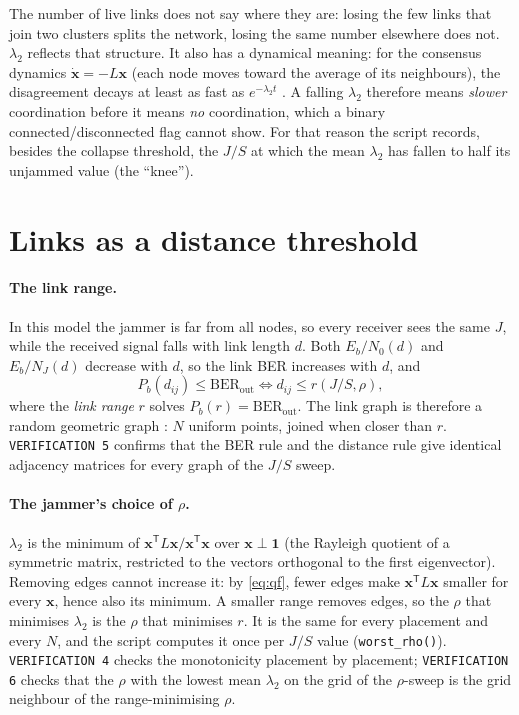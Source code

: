 \documentclass[11pt,a4paper]{article}
\newcommand{\bone}{\mathbf 1}
\newcommand{\bx}{\mathbf x}
\newcommand{\T}{^{\mathsf T}}
\newcommand{\BERout}{\mathrm{BER}_{\mathrm{out}}}
\begin{document}
The number of live links does not say where they are: losing the few links
that join two clusters splits the network, losing the same number elsewhere
does not. $\lambda_2$ reflects that structure. It also has a dynamical meaning: for the consensus dynamics
$\dot{\bx} = -L\bx$ (each node moves toward the average of its neighbours),
the disagreement decays at least as fast as $e^{-\lambda_2 t}$
\cite[Corollary~1]{olfati}. A falling
$\lambda_2$ therefore means \emph{slower} coordination before it means
\emph{no} coordination, which a binary connected/disconnected flag cannot show.
For that reason the script records, besides the collapse threshold, the $J/S$
at which the mean $\lambda_2$ has fallen to half its unjammed value (the
``knee'').

\section{Links as a distance threshold}

\paragraph{The link range.}
In this model the jammer is far from all nodes, so every receiver sees the same
$J$, while the received signal falls with link length $d$. Both
$E_b/N_0(d)$ and $E_b/N_J(d)$ decrease with $d$, so the link BER increases with
$d$, and
\[
  P_b(d_{ij})\le\BERout \iff d_{ij}\le r(J/S,\rho),
\]
where the \emph{link range} $r$ solves $P_b(r)=\BERout$. The link graph is
therefore a random geometric graph \cite{penrose}: $N$ uniform points, joined
when closer than $r$. \texttt{VERIFICATION 5} confirms that the BER rule and
the distance rule give identical adjacency matrices for every graph of the
$J/S$ sweep.

\paragraph{The jammer's choice of $\rho$.}
$\lambda_2$ is the minimum of $\bx\T L\bx/\bx\T\bx$ over $\bx\perp\bone$
(the Rayleigh quotient of a symmetric matrix, restricted to the vectors
orthogonal to the first eigenvector). Removing edges cannot increase it: by
\eqref{eq:qf}, fewer edges make $\bx\T L\bx$ smaller for every $\bx$, hence
also its minimum. A smaller range removes edges, so the $\rho$ that minimises
$\lambda_2$ is the $\rho$ that minimises $r$. It is the same for every
placement and every $N$, and the script computes it once per $J/S$ value
(\texttt{worst\_rho()}). \texttt{VERIFICATION 4} checks the monotonicity
placement by placement; \texttt{VERIFICATION 6} checks that the $\rho$ with the
lowest mean $\lambda_2$ on the grid of the $\rho$-sweep is the grid neighbour
of the range-minimising $\rho$.
\end{document}
